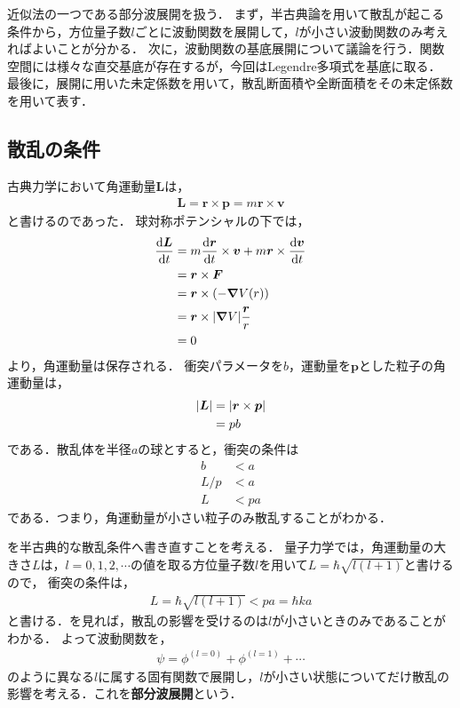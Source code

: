 \documentclass{report}
\begin{document}
  近似法の一つである部分波展開を扱う．
  まず，半古典論を用いて散乱が起こる条件から，方位量子数$l$ごとに波動関数を展開して，$l$が小さい波動関数のみ考えればよいことが分かる．
  次に，波動関数の基底展開について議論を行う．関数空間には様々な直交基底が存在するが，今回はLegendre多項式を基底に取る．
  最後に，展開に用いた未定係数を用いて，散乱断面積や全断面積をその未定係数を用いて表す．
  \subsection{散乱の条件}
    古典力学において角運動量$\bm{L}$は，
    \begin{align}
      \bm{L} = \bm{r} \times \bm{p} = m\bm{r} \times \bm{v}
    \end{align}
    と書けるのであった．
    球対称ポテンシャルの下では，
    \begin{align}
      \dv{\bm{L}}{t} &= m\dv{\bm{r}}{t} \times \bm{v} + m\bm{r} \times \dv{\bm{v}}{t} \\
      &= \bm{r} \times \bm{F} \\
      &= \bm{r} \times (-\grad V(r)) \\
      &= \bm{r} \times \abs{\grad V}\frac{\bm{r}}{r} \\
      &= 0
    \end{align}
    より，角運動量は保存される．
    衝突パラメータを$b$，運動量を$\bm{p}$とした粒子の角運動量は，
    \begin{align}
      \abs{\bm{L}} &= \abs{\bm{r} \times \bm{p}} \\
      &= pb
    \end{align}
    である．散乱体を半径$a$の球とすると，衝突の条件は
    \begin{align}
      b &< a \\
      L/p &< a \\
      L &< pa \label{ConditionofSC}
    \end{align}
    である．つまり，角運動量が小さい粒子のみ散乱することがわかる．
    \par
    を半古典的な散乱条件へ書き直すことを考える．
    量子力学では，角運動量の大きさ$L$は，$l = 0, 1, 2, \cdots$の値を取る方位量子数$l$を用いて$L = \hbar \sqrt{l(l + 1)}$と書けるので，
    衝突の条件は，
    \begin{align}
      L = \hbar \sqrt{l(l + 1)} < pa = \hbar ka\label{scattering-condition-of-l}
    \end{align}
    と書ける．を見れば，散乱の影響を受けるのは$l$が小さいときのみであることがわかる．
    よって波動関数を，
    \begin{align}
      \psi = \phi^{(l = 0)} + \phi^{(l = 1)} + \cdots
    \end{align}
    のように異なる$l$に属する固有関数で展開し，$l$が小さい状態についてだけ散乱の影響を考える．これを\textbf{部分波展開}という．
\end{document}
